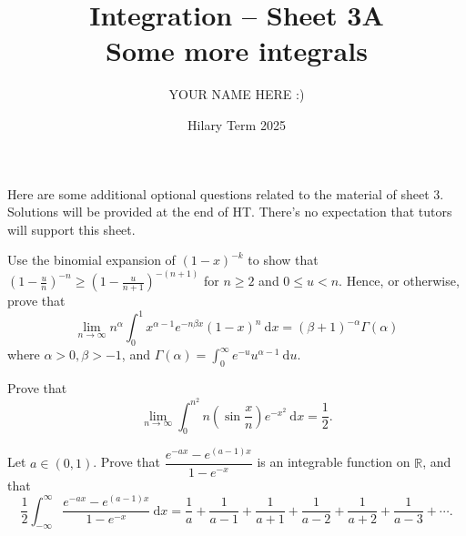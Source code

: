 \documentclass[answers]{exam}
\title{Integration -- Sheet 3A\\Some more integrals}
\author{YOUR NAME HERE :)}
\date{Hilary Term 2025}
\begin{document}
\maketitle

Here are some additional optional questions related to the material of sheet 3. Solutions will be provided at the end of HT. There's no expectation that tutors will support this sheet.

\begin{questions}

\question%
Use the binomial expansion of $(1-x)^{-k}$ to show that $\left(1-\frac{u}{n}\right)^{-n} \geqslant\left(1-\frac{u}{n+1}\right)^{-(n+1)}$ for $n \geqslant 2$ and $0 \leqslant u<n$. Hence, or otherwise, prove that \[
	\lim_{n \to \infty} n^{\alpha} \int_{0}^{1} x^{\alpha-1} e^{-n \beta x}(1-x)^{n}~\mathrm d x=(\beta+1)^{-\alpha} \Gamma(\alpha)
\] where $\alpha>0, \beta>-1$, and $\Gamma(\alpha)=\int_{0}^{\infty} e^{-u} u^{\alpha-1}~\mathrm d u$.



\question%
Prove that \[
	\lim_{n\to\infty}\int_0^{n^2}n\left(\sin\frac xn\right)e^{-x^2}~\mathrm d x=\frac12.
\]



\question%
Let $a \in(0,1)$. Prove that $\dfrac{e^{-a x}-e^{(a-1) x}}{1-e^{-x}}$ is an integrable function on $\mathbb{R}$, and that \[
	\frac12\int_{-\infty}^\infty\frac{e^{-ax}-e^{(a-1)x}}{1-e^{-x}}~\mathrm dx=\frac1a+\frac1{a-1}+\frac1{a+1}+\frac1{a-2}+\frac1{a+2}+\frac1{a-3}+\cdots.
\]

\end{questions}
\end{document}
